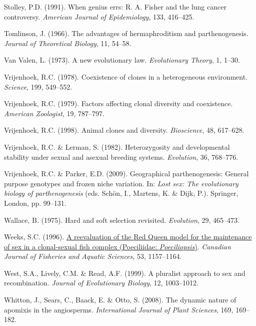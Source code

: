 \documentclass[
  american,
  letterpaper,
]{book}
\newlength{\cslhangindent}
\newenvironment{CSLReferences}[2] %
 {\begin{list}{}{%
  \setlength{\itemindent}{0pt}
  \setlength{\leftmargin}{0pt}
  \setlength{\parsep}{0pt}
  \ifodd #1
   \setlength{\leftmargin}{\cslhangindent}
   \setlength{\itemindent}{-1\cslhangindent}
  \fi
  \setlength{\itemsep}{#2\baselineskip}}}
 {\end{list}}
\begin{document}
\begin{CSLReferences}{1}{0}
Stolley, P.D. (1991). When genius errs: R. A. Fisher and the lung cancer
controversy. \emph{American Journal of Epidemiology}, 133, 416--425.

Tomlinson, J. (1966). The advantages of hermaphroditism and
parthenogenesis. \emph{Journal of Theoretical Biology}, 11, 54--58.

Van Valen, L. (1973). A new evolutionary law. \emph{Evolutionary
Theory}, 1, 1--30.

Vrijenhoek, R.C. (1978). Coexistence of clones in a heterogeneous
environment. \emph{Science}, 199, 549--552.

Vrijenhoek, R.C. (1979). Factors affecting clonal diversity and
coexistence. \emph{American Zoologist}, 19, 787--797.

Vrijenhoek, R.C. (1998). Animal clones and diversity. \emph{Bioscience},
48, 617--628.

Vrijenhoek, R.C. \& Lerman, S. (1982). Heterozygosity and developmental
stability under sexual and asexual breeding systems. \emph{Evolution},
36, 768--776.

Vrijenhoek, R.C. \& Parker, E.D. (2009). Geographical parthenogenesis:
General purpose genotypes and frozen niche variation. In: \emph{Lost
sex: The evolutionary biology of parthenogenesis} (eds. Schön, I.,
Martens, K. \& Dijk, P.). Springer, London, pp. 99--131.

Wallace, B. (1975). Hard and soft selection revisited. \emph{Evolution},
29, 465--473.

Weeks, S.C. (1996). \href{https://doi.org/10.1139/f96-041}{A
reevaluation of the {Red Queen} model for the maintenance of sex in a
clonal-sexual fish complex ({Poeciliidae}: \emph{{P}oeciliopsis})}.
\emph{Canadian Journal of Fisheries and Aquatic Sciences}, 53,
1157--1164.

West, S.A., Lively, C.M. \& Read, A.F. (1999). A pluralist approach to
sex and recombination. \emph{Journal of Evolutionary Biology}, 12,
1003--1012.

Whitton, J., Sears, C., Baack, E. \& Otto, S. (2008). The dynamic nature
of apomixis in the angiosperms. \emph{International Journal of Plant
Sciences}, 169, 169--182.


\end{CSLReferences}
\end{document}
